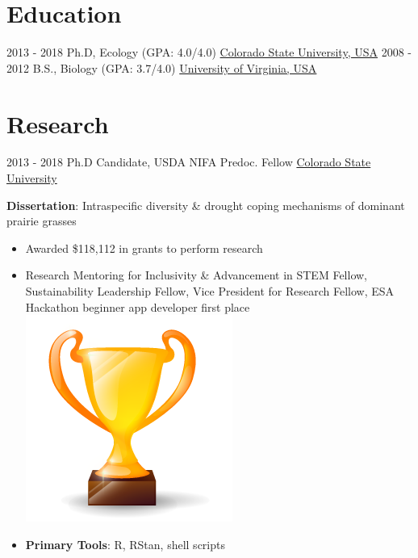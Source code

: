 \documentclass[letterpaper]{twentysecondcv} %
\begin{document}
\makeprofile %

\section{Education}

\begin{twenty} %
	\twentyitem
    	{2013 - 2018}
        {}
        {Ph.D, Ecology \textnormal{(GPA: 4.0/4.0)}}
        {\href{http://www.colostate.edu/}{Colorado State University, USA}}
        {}
        {}
	\twentyitem
    	{2008 - 2012}
		{}
        {B.S., Biology \textnormal{(GPA: 3.7/4.0)}}
        {\href{http://www.virginia.edu/}{University of Virginia, USA}}
        {}
        {}
\end{twenty}

\section{Research}
\begin{twenty}
	\twentyitem
    	{2013 - 2018}
		{}
        {Ph.D Candidate, USDA NIFA Predoc. Fellow}
        {\href{http://www.colostate.edu/}{Colorado State University}}
        {}
        {
       	\textbf{Dissertation}: Intraspecific diversity \& drought coping mechanisms of dominant prairie grasses
        {\begin{itemize}
        \item Awarded \$118,112 in grants to perform research
        \item Research Mentoring for Inclusivity \& Advancement in STEM Fellow, Sustainability Leadership Fellow, Vice President for Research Fellow, ESA Hackathon beginner app developer first place  {\includegraphics[scale=0.04]{img/trophy.png}}
        \item \textbf{Primary Tools}: R, RStan, shell scripts \vspace{2mm}
		\end{itemize}}
        }
\end{twenty}
\end{document}

